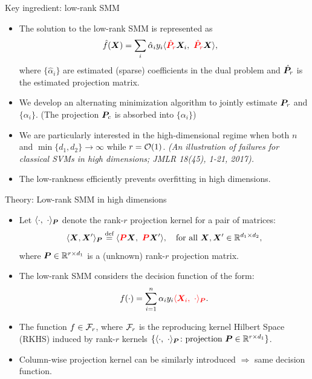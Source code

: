 \documentclass[compress,dvipsnames]{beamer}
\let\olditem\item
\renewcommand\item{\olditem\justifying}
\begin{document}
\begin{frame}{Key ingredient: low-rank SMM}
\begin{itemize}
\item The solution to the low-rank SMM is represented as
\begin{align}
\hat f(\bm{X})&=\sum_{i}\hat \alpha_i y_i\langle {\color{red}\hat {\bm{P}}_r}\bm{X}_i,\ {\color{red}\hat {\bm{P}}_r }\bm{X} \rangle,
\end{align}
where $\{\hat \alpha_i\}$ are estimated (sparse) coefficients in the dual problem and $\hat {\bm{P}}_r$ is the estimated projection matrix. 
\item We develop an alternating minimization algorithm to jointly estimate $\bm{P}_r$ and $\{\alpha_i\}$. (The projection $\bm{P}_c$ is absorbed into $\{\alpha_i\}$)
\item We are particularly interested in the high-dimensional regime when both $n$ and $\min\{d_1,d_2\}\to \infty$ while $r={\mathcal O}(1)$. {\it \scriptsize(An illustration of failures for classical SVMs in high dimensions; JMLR 18(45), 1-21, 2017).} 
\item The {\color{red}low-rankness} efficiently prevents overfitting in high dimensions.
 \end{itemize}
\end{frame}

\begin{frame}{Theory: Low-rank SMM in high dimensions}

\begin{itemize}
\item Let $\langle \cdot,\ \cdot \rangle_{\bm{P}}$ denote the rank-$r$ projection kernel for a pair of matrices:
\[
\langle \bm{X}, \bm{X}' \rangle_{\bm{P}}\stackrel{\text{def}}{=} \langle {\color{red}\bm{P}} \bm{X},\ {\color{red}\bm{P}} \bm{X}'\rangle, \quad \text{for all }\bm{X}, \bm{X}'\in\mathbb{R}^{d_1\times d_2},
\]
where $\bm{P}\in \mathbb{R}^{r\times d_1}$ is a (unknown) rank-$r$ projection matrix.
\item The low-rank SMM considers the decision function of the form:
\begin{align}\label{eq:f}
f(\cdot)=\sum_{i=1}^n \alpha_i y_i {\color{red}\langle \bm{X}_i,\ \cdot \rangle_{\bm{P}}}.
\end{align}
\item The function $f\in {\mathcal F}_r$, where ${\mathcal F}_r$ is the reproducing kernel Hilbert Space (RKHS) induced by rank-$r$ kernels $\{\langle \cdot,\ \cdot\rangle_{\bm{P}}\colon {\text{projection }} \bm{P}\in\mathbb{R}^{r\times d_1}\}$. 
\item Column-wise projection kernel can be similarly introduced $\Rightarrow$ same decision function. 
\end{itemize}
\end{frame}
\end{document}

